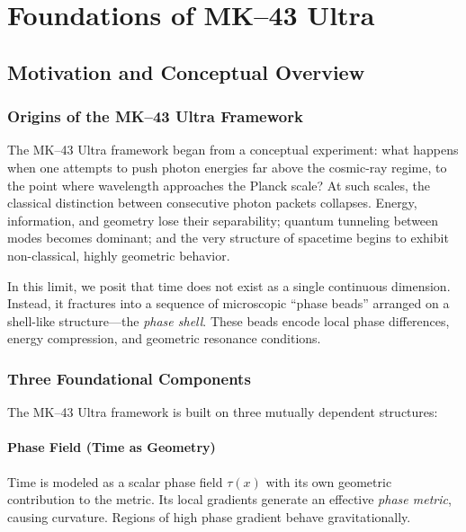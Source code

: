 

\part{Foundations of MK--43 Ultra}

\chapter{Motivation and Conceptual Overview}

\section{Origins of the MK--43 Ultra Framework}

The MK--43 Ultra framework began from a conceptual experiment: 
what happens when one attempts to push photon energies far above the cosmic-ray regime, to the point where wavelength approaches the Planck scale? 
At such scales, the classical distinction between consecutive photon packets collapses. 
Energy, information, and geometry lose their separability; quantum tunneling between modes becomes dominant; and the very structure of spacetime begins to exhibit non-classical, highly geometric behavior.

In this limit, we posit that time does not exist as a single continuous dimension. 
Instead, it fractures into a sequence of microscopic ``phase beads'' arranged on a shell-like structure---the \emph{phase shell}. 
These beads encode local phase differences, energy compression, and geometric resonance conditions.

\section{Three Foundational Components}

The MK--43 Ultra framework is built on three mutually dependent structures:

\subsection{Phase Field (Time as Geometry)}
Time is modeled as a scalar phase field $\tau(x)$ with its own geometric contribution to the metric. 
Its local gradients generate an effective \emph{phase metric}, causing curvature. 
Regions of high phase gradient behave gravitationally.

